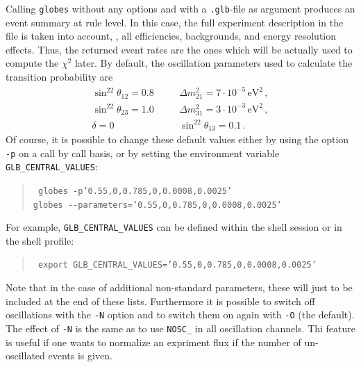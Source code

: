 Calling {\tt globes} without any options and with a {\tt .glb}-file as argument produces an event summary at rule level. In this case,  
the full experiment description in the file is taken into account, \ie, all efficiencies, backgrounds, and energy resolution effects. 
Thus, the returned event rates are the ones which will be actually 
used to compute the $\chi^2$ later. By default, the oscillation parameters used to calculate the transition probability are
\begin{eqnarray}
\label{eq:globes_params}
\sin^22\theta_{12}=0.8&\quad&\Delta m^2_{21}=7\cdot10^{-5}
\,\mathrm{eV}^2\,,\nonumber\\
\sin^22\theta_{23}=1.0&\quad&\Delta m^2_{31}=3\cdot10^{-3}
\,\mathrm{eV}^2\,,\nonumber\\
\delta=0&\quad&\sin^22\theta_{13}=0.1\,.\
\end{eqnarray}
Of course, it is possible to change these default values either by using the
option {\tt -p} on a call by call basis, or by setting the environment variable
{\tt GLB\_CENTRAL\_VALUES}:
%
%
\begin{quote}
{\tt
globes -p'0.55,0,0.785,0,0.0008,0.0025'\\
globes \verb+--+parameters='0.55,0,0.785,0,0.0008,0.0025'
}
\end{quote}
For example, {\tt GLB\_CENTRAL\_VALUES} can be defined
within the shell session or in the shell profile:
\begin{quote}
{\tt
export GLB\_CENTRAL\_VALUES='0.55,0,0.785,0,0.0008,0.0025'
}
\end{quote}
Note that in the case of additional non-standard parameters, these will just to 
be included at the end of these lists.
Furthermore it is possible to switch off oscillations with the {\tt -N} option and to switch them on again with {\tt -O} (the default). The effect of {\tt -N} is the same as to use {\tt NOSC\_} in all oscillation channels.
Thi feature is useful if one wants to normalize an expriment flux if
the number of un-oscillated events is given.


